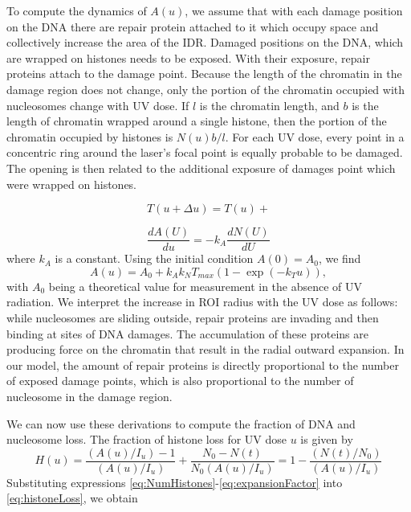 \documentclass[12pt]{article}
\begin{document}
To compute the dynamics of $A(u)$, we assume that with each damage position on the DNA there are repair protein attached to it which occupy space and collectively increase the area of the IDR. Damaged positions on the DNA, which are wrapped on histones needs to be exposed. With their exposure, repair proteins attach to the damage point. Because the length of the chromatin in the damage region does not change, only the portion of the chromatin occupied with nucleosomes change with UV dose. If $l$ is the chromatin length, and $b$ is the length of chromatin wrapped around a single histone, then the portion of the chromatin occupied by histones is $N(u)b/l$. For each UV dose, every point in a concentric ring around the laser's focal point is equally probable to be damaged. The opening is then related to the additional exposure of damages point which were wrapped on histones. 

\begin{equation}
T(u+\Delta u)=T(u)+
\end{equation}


\begin{equation}\label{dralpha}
\frac{dA(U)}{du}=-k_A\frac{dN(U)}{dU}
\end{equation}
where $k_A$ is a constant. Using the initial condition $A(0)=A_0$, we find 
\begin{equation}\label{eq:expansionFactor}
A(u) = A_0 +k_Ak_NT_{max}\left(1-\exp(-k_Tu)\right),
\end{equation}
with $A_0$ being a theoretical value for measurement in the absence of UV radiation. We interpret the increase in ROI radius with the UV dose as follows: while nucleosomes are sliding outside, repair proteins are invading and then binding at sites of DNA damages. The accumulation of these proteins are producing force on the chromatin that result in the radial outward expansion. In our model, the amount of repair proteins is directly proportional to the number of exposed damage points, which is also proportional to the number of nucleosome in the damage region.

We can now use these derivations to compute the fraction of DNA and nucleosome loss. The fraction of histone loss for UV dose $u$ is given by
\begin{equation}\label{eq:histoneLoss}
H(u) = \frac{(A(u)/I_u)-1}{(A(u)/I_u)} +\frac{N_0-N(t)}{N_0(A(u)/I_u)}=1-\frac{(N(t)/N_0)}{(A(u)/I_u)}
\end{equation}
Substituting expressions \ref{eq:NumHistones}-\ref{eq:expansionFactor} into \ref{eq:histoneLoss}, we obtain
\end{document}
